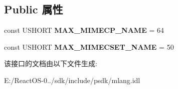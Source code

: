 \subsection*{Public 属性}
\begin{DoxyCompactItemize}
\item 
\mbox{\label{interface_multi_language_1_1_i_enum_code_page_a623547da4b5723f930b70560bd568db5}} 
const U\+S\+H\+O\+RT {\bfseries M\+A\+X\+\_\+\+M\+I\+M\+E\+C\+P\+\_\+\+N\+A\+ME} = 64
\item 
\mbox{\label{interface_multi_language_1_1_i_enum_code_page_a2d7b9e390287d58128e536cbcb4c8cd5}} 
const U\+S\+H\+O\+RT {\bfseries M\+A\+X\+\_\+\+M\+I\+M\+E\+C\+S\+E\+T\+\_\+\+N\+A\+ME} = 50
\end{DoxyCompactItemize}


该接口的文档由以下文件生成\+:\begin{DoxyCompactItemize}
\item 
E\+:/\+React\+O\+S-\/0../sdk/include/psdk/mlang.\+idl\end{DoxyCompactItemize}
